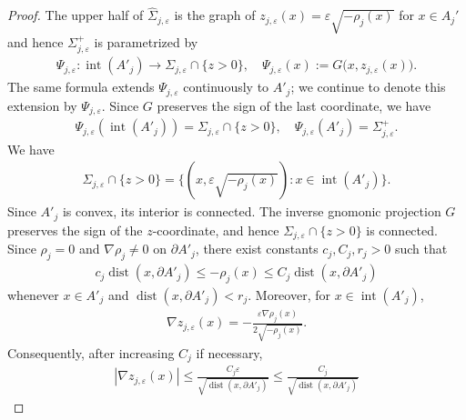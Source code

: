 \documentclass[10pt,a4paper]{amsart}
\newcommand{\dist}{\operatorname{dist}}
\begin{document}
\begin{proof}
The upper half of $\widehat\Sigma_{j,\varepsilon}$ is the graph of $ z_{j,\varepsilon}(x)= \varepsilon\sqrt{-\rho_j(x)}$ for $x\in A_j'$ and hence $\Sigma_{j,\varepsilon}^+$ is parametrized by
\begin{align}
        \Psi_{j,\varepsilon}:\operatorname{int}(A'_j)
        \rightarrow
        \Sigma_{j,\varepsilon}\cap\{z>0\},
        \quad 
        \Psi_{j,\varepsilon}(x)
        :=
        G\bigl(x,z_{j,\varepsilon}(x)\bigr).
\end{align}
The same formula extends $\Psi_{j,\varepsilon}$ continuously to $A'_j$;
we continue to denote this extension by $\Psi_{j,\varepsilon}$. Since
$G$ preserves the sign of the last coordinate, we have
\begin{align}
        \Psi_{j,\varepsilon}
        \left(
        \operatorname{int}(A'_j)
        \right)
        =
        \Sigma_{j,\varepsilon}\cap\{z>0\},
        \quad
        \Psi_{j,\varepsilon}(A'_j)
        =
        \Sigma_{j,\varepsilon}^+.
\end{align}
 We have
\begin{align}
        \widehat\Sigma_{j,\varepsilon}\cap\{z>0\}
        =
        \{
        (x,\varepsilon\sqrt{-\rho_j(x)}):
        x\in\operatorname{int}(A'_j)
        \}.
\end{align}
Since $A'_j$ is convex, its interior is connected. The inverse gnomonic
projection $G$ preserves the sign of the $z$-coordinate, and hence
$\Sigma_{j,\varepsilon}\cap\{z>0\}$ is connected. Since $\rho_j=0$ and $\nabla\rho_j\neq0$ on $\partial A'_j$, there exist
constants $c_j,C_j,r_j>0$ such that
\begin{align}\label{eq:hemisphere-pancake-defining-function-distance}
        c_j\dist(x,\partial A'_j)
        \leq
        -\rho_j(x)
        \leq
        C_j\dist(x,\partial A'_j)
\end{align}
whenever $x\in A'_j$ and
$\dist(x,\partial A'_j)<r_j$. Moreover,
for $x\in\operatorname{int}(A'_j)$,
\begin{align}
        \nabla z_{j,\varepsilon}(x)
        =
        -\frac{\varepsilon\nabla\rho_j(x)}
        {2\sqrt{-\rho_j(x)}}.
\end{align}
Consequently, after increasing $C_j$ if necessary,
\begin{align}\label{eq:hemisphere-pancake-graph-gradient-bound}
        |\nabla z_{j,\varepsilon}(x)|
        \leq
        \frac{C_j\varepsilon}
        {\sqrt{\dist(x,\partial A'_j)}}
        \leq
        \frac{C_j}
        {\sqrt{\dist(x,\partial A'_j)}}
\end{align}

\end{proof}
\end{document}

